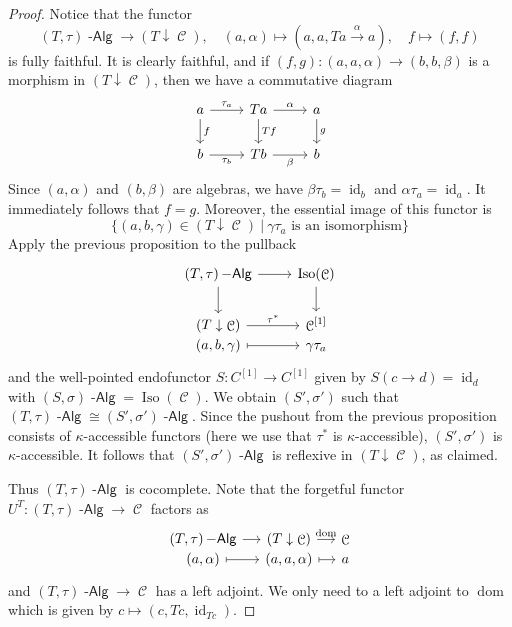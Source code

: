 \documentclass[a4paper,11pt,oneside,openany]{scrbook}
\DeclareMathOperator{\Alg}{-\mathsf{Alg}}
\newcommand{\from}{\colon}
\DeclareMathOperator{\C}{\mathcal{C}}
\DeclareMathOperator{\id}{id}
\DeclareMathOperator{\dom}{dom}
\theoremstyle{definition}
\theoremstyle{definition}
\begin{document}
\begin{proof}
    Notice that the functor 
    \begin{displaymath}
	(T,\tau)\Alg \to (T \downarrow \C), \quad (a,\alpha) \mapsto (a,a,Ta \xrightarrow{\alpha} a), \quad f \mapsto (f,f)
    \end{displaymath}
    is fully faithful.
    It is clearly faithful, and if $ (f,g)\from (a,a,\alpha) \to (b,b,\beta) $
    is a morphism in $ (T \downarrow \C) $, then we have a commutative diagram
    \begin{displaymath}
        \begin{tikzcd}
	    a \arrow[d,"f"]\arrow[r, "\tau_a"]& Ta \arrow[d, "Tf"] \arrow[r, "\alpha"] & a\arrow[d, "g"]\\
	    b\arrow[r,"\tau_b"'] & Tb \arrow[r, "\beta"']& b
        \end{tikzcd}
    \end{displaymath}
    Since $ (a,\alpha) $ and $ (b,\beta) $ are algebras, we have $ \beta\tau_b = \id_b $ and $ \alpha \tau_a = \id_a $.
    It immediately follows that $ f = g $.
    Moreover, the essential image of this functor is
    \begin{displaymath}
         \{(a,b,\gamma)\in (T\downarrow\C)\ |\ \gamma\tau_a \text{ is an isomorphism}\} 
    \end{displaymath}
    Apply the previous proposition to the pullback
    \begin{displaymath}
        \begin{tikzcd}
	    (T,\tau)\Alg \arrow[d]\arrow[r] & \operatorname{Iso}(\C) \arrow[d]\\
	    (T\downarrow\C) \arrow[r, "\tau^*"] & \C^{[1]}\\[-2.1em]
	    (a,b,\gamma)\arrow[r, mapsto] & \gamma\tau_a
        \end{tikzcd}
    \end{displaymath}	
    and the well-pointed endofunctor $ S\from C^{[1]} \to C^{[1]} $ given by $ S(c\to d) = \id_{d} $ with $ (S,\sigma)\Alg = \operatorname{Iso}(\C) $.
    We obtain $ (S',\sigma') $ such that $ (T,\tau)\Alg \cong (S',\sigma')\Alg $.
    Since the pushout from the previous proposition consists of $ \kappa $-accessible functors (here we use that $ \tau^* $ is $ \kappa $-accessible), $ (S',\sigma') $ is $ \kappa $-accessible.
    It follows that $ (S',\sigma')\Alg $ is reflexive in $ (T\downarrow\C) $, as claimed.
    
    Thus $ (T,\tau)\Alg $ is cocomplete.
    Note that the forgetful functor $ U^T \from (T,\tau)\Alg \to \C $ factors as
    \begin{displaymath}
	\begin{tikzcd}[column sep = small]
	    (T,\tau)\Alg \arrow[r]& (T\downarrow\C)\arrow[r,"\text{dom}"] & \C  \\[-2.1em]
	    (a,\alpha) \arrow[r,mapsto] & (a,a,\alpha) \arrow[r,mapsto] & a
	 \end{tikzcd}
    \end{displaymath}
    and $ (T,\tau)\Alg \to \C $ has a left adjoint.
    We only need to a left adjoint to $ \dom $ which is given by $ c \mapsto (c,Tc, \id_{Tc}) $.
\end{proof}
\end{document}
